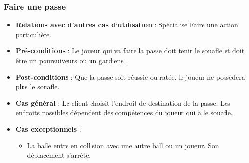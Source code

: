 \documentclass[a4paper,titlepage]{scrreprt}
\begin{document}
    \subsubsection{Faire une passe}
      \begin{itemize}
        \item \textbf{Relations avec d'autres cas d'utilisation}  : Spécialise Faire une action particulière.
        \item \textbf{Pré-conditions} : Le joueur qui va faire la passe doit tenir le \gls{souafle} et doit être un \gls{poursuiveur}s  ou un \gls{gardien}s .
        \item \textbf{Post-conditions} : Que la passe soit réussie ou ratée, le joueur ne possèdera plus le souafle.
        \item \textbf{Cas général} : Le client choisit l’endroit de destination de la passe. Les endroits possibles dépendent des compétences du joueur qui a le souafle. %
        \item \textbf{Cas exceptionnels} :
        \begin{itemize}
            \item La balle entre en collision avec une autre ball ou un joueur. Son déplacement s'arrête.
        \end{itemize}
      \end{itemize}
\end{document}
